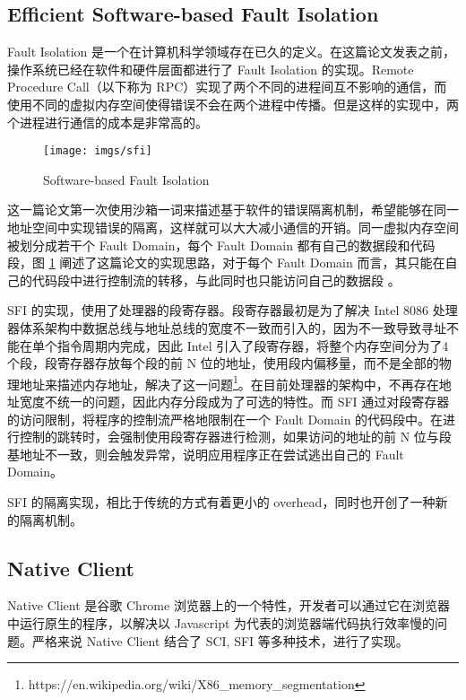\subsection{Efficient Software-based Fault Isolation}
\label{sss:esfi}

Fault Isolation 是一个在计算机科学领域存在已久的定义。在这篇论文发表之前，操作系统已经在软件和硬件层面都进行了 Fault Isolation 的实现。Remote Procedure Call（以下称为 RPC）实现了两个不同的进程间互不影响的通信，而使用不同的虚拟内存空间使得错误不会在两个进程中传播。但是这样的实现中，两个进程进行通信的成本是非常高的。

\begin{figure}[!htp]
 \centering
 \texttt{[image: imgs/sfi]}
 \caption{Software-based Fault Isolation}
 \label{fig:sfi}
\end{figure}

这一篇论文第一次使用沙箱一词来描述基于软件的错误隔离机制，希望能够在同一地址空间中实现错误的隔离，这样就可以大大减小通信的开销。同一虚拟内存空间被划分成若干个 Fault Domain，每个 Fault Domain 都有自己的数据段和代码段，图 \ref{fig:sfi} 阐述了这篇论文的实现思路，对于每个 Fault Domain 而言，其只能在自己的代码段中进行控制流的转移，与此同时也只能访问自己的数据段 \parencite{wahbe1994efficient}。

SFI 的实现，使用了处理器的段寄存器。段寄存器最初是为了解决 Intel 8086 处理器体系架构中数据总线与地址总线的宽度不一致而引入的，因为不一致导致寻址不能在单个指令周期内完成，因此 Intel 引入了段寄存器，将整个内存空间分为了4个段，段寄存器存放每个段的前 N 位的地址，使用段内偏移量，而不是全部的物理地址来描述内存地址，解决了这一问题\footnote{https://en.wikipedia.org/wiki/X86\_memory\_segmentation}。在目前处理器的架构中，不再存在地址宽度不统一的问题，因此内存分段成为了可选的特性。而 SFI 通过对段寄存器的访问限制，将程序的控制流严格地限制在一个 Fault Domain 的代码段中。在进行控制的跳转时，会强制使用段寄存器进行检测，如果访问的地址的前 N 位与段基地址不一致，则会触发异常，说明应用程序正在尝试逃出自己的 Fault Domain。

SFI 的隔离实现，相比于传统的方式有着更小的 overhead，同时也开创了一种新的隔离机制。

\subsection{Native Client}
\label{sss:nacl}

Native Client 是谷歌 Chrome 浏览器上的一个特性，开发者可以通过它在浏览器中运行原生的程序，以解决以 Javascript 为代表的浏览器端代码执行效率慢的问题。严格来说 Native Client 结合了 SCI, SFI 等多种技术，进行了实现。

